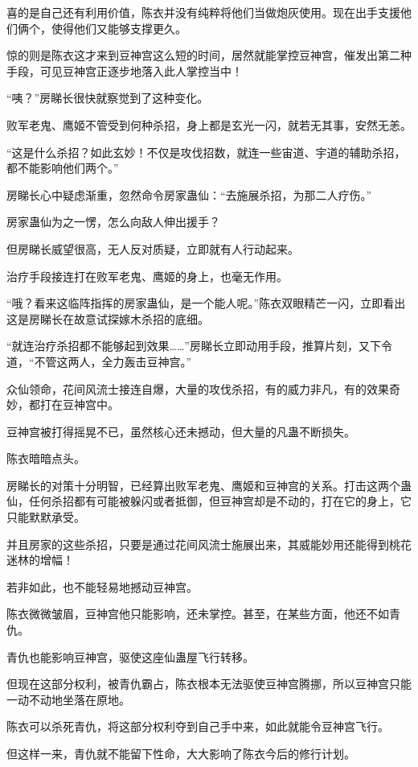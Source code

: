 \begin{this_body}
喜的是自己还有利用价值，陈衣并没有纯粹将他们当做炮灰使用。现在出手支援他们俩个，使得他们又能够支撑更久。

惊的则是陈衣这才来到豆神宫这么短的时间，居然就能掌控豆神宫，催发出第二种手段，可见豆神宫正逐步地落入此人掌控当中！

“咦？”房睇长很快就察觉到了这种变化。

败军老鬼、鹰姬不管受到何种杀招，身上都是玄光一闪，就若无其事，安然无恙。

“这是什么杀招？如此玄妙！不仅是攻伐招数，就连一些宙道、宇道的辅助杀招，都不能影响他们两个。”

房睇长心中疑虑渐重，忽然命令房家蛊仙：“去施展杀招，为那二人疗伤。”

房家蛊仙为之一愣，怎么向敌人伸出援手？

但房睇长威望很高，无人反对质疑，立即就有人行动起来。

治疗手段接连打在败军老鬼、鹰姬的身上，也毫无作用。

“哦？看来这临阵指挥的房家蛊仙，是一个能人呢。”陈衣双眼精芒一闪，立即看出这是房睇长在故意试探嫁木杀招的底细。

“就连治疗杀招都不能够起到效果……”房睇长立即动用手段，推算片刻，又下令道，“不管这两人，全力轰击豆神宫。”

众仙领命，花间风流士接连自爆，大量的攻伐杀招，有的威力非凡，有的效果奇妙，都打在豆神宫中。

豆神宫被打得摇晃不已，虽然核心还未撼动，但大量的凡蛊不断损失。

陈衣暗暗点头。

房睇长的对策十分明智，已经算出败军老鬼、鹰姬和豆神宫的关系。打击这两个蛊仙，任何杀招都有可能被躲闪或者抵御，但豆神宫却是不动的，打在它的身上，它只能默默承受。

并且房家的这些杀招，只要是通过花间风流士施展出来，其威能妙用还能得到桃花迷林的增幅！

若非如此，也不能轻易地撼动豆神宫。

陈衣微微皱眉，豆神宫他只能影响，还未掌控。甚至，在某些方面，他还不如青仇。

青仇也能影响豆神宫，驱使这座仙蛊屋飞行转移。

但现在这部分权利，被青仇霸占，陈衣根本无法驱使豆神宫腾挪，所以豆神宫只能一动不动地坐落在原地。

陈衣可以杀死青仇，将这部分权利夺到自己手中来，如此就能令豆神宫飞行。

但这样一来，青仇就不能留下性命，大大影响了陈衣今后的修行计划。


\end{this_body}
